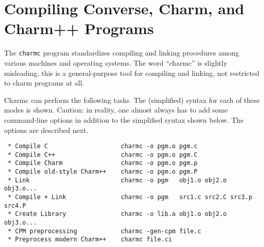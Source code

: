 %
%
%
%
%
%
%
%
%
%

\section{Compiling Converse, Charm, and Charm++ Programs}

The {\tt charmc} program standardizes compiling and linking procedures
among various machines and operating systems.  The word ``charmc'' is
slightly misleading, this is a general-purpose tool for compiling and
linking, not restricted to charm programs at all.

Charmc can perform the following tasks.  The (simplified) syntax for
each of these modes is shown.  Caution: in reality, one almost always
has to add some command-line options in addition to the simplified
syntax shown below.  The options are described next.

\begin{verbatim}
 * Compile C                    charmc -o pgm.o pgm.c
 * Compile C++                  charmc -o pgm.o pgm.C
 * Compile Charm                charmc -o pgm.o pgm.p
 * Compile old-style Charm++    charmc -o pgm.o pgm.P
 * Link                         charmc -o pgm   obj1.o obj2.o obj3.o...
 * Compile + Link               charmc -o pgm   src1.c src2.C src3.p src4.P
 * Create Library               charmc -o lib.a obj1.o obj2.o obj3.o...
 * CPM preprocessing            charmc -gen-cpm file.c
 * Preprocess modern Charm++    charmc file.ci
\end{verbatim}

